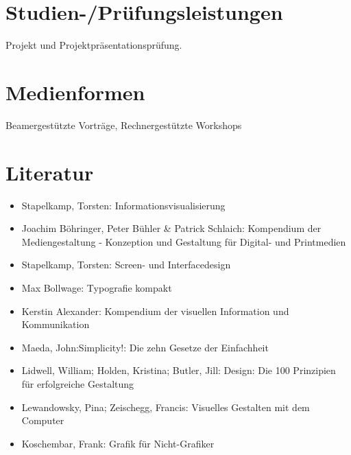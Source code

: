 \hypertarget{studien-pruxfcfungsleistungenpathlabel....srcmodulbeschreibungen-bachelor-bpo5ba_screendesign}{%
\section*{Studien-/Prüfungsleistungen\label{../../src/modulbeschreibungen-bachelor-bpo5/BA_Screendesign}}\label{studien-pruxfcfungsleistungenpathlabel....srcmodulbeschreibungen-bachelor-bpo5ba_screendesign}}

Projekt und Projektpräsentationsprüfung.

\hypertarget{medienformenpathlabel....srcmodulbeschreibungen-bachelor-bpo5ba_screendesign}{%
\section*{Medienformen\label{../../src/modulbeschreibungen-bachelor-bpo5/BA_Screendesign}}\label{medienformenpathlabel....srcmodulbeschreibungen-bachelor-bpo5ba_screendesign}}

Beamergestützte Vorträge, Rechnergestützte Workshops

\hypertarget{literaturpathlabel....srcmodulbeschreibungen-bachelor-bpo5ba_screendesign}{%
\section*{Literatur\label{../../src/modulbeschreibungen-bachelor-bpo5/BA_Screendesign}}\label{literaturpathlabel....srcmodulbeschreibungen-bachelor-bpo5ba_screendesign}}

\begin{itemize}
\tightlist
\item
  Stapelkamp, Torsten: Informationsvisualisierung
\item
  Joachim Böhringer, Peter Bühler \& Patrick Schlaich: Kompendium der
  Mediengestaltung - Konzeption und Gestaltung für Digital- und
  Printmedien
\item
  Stapelkamp, Torsten: Screen- und Interfacedesign
\item
  Max Bollwage: Typografie kompakt
\item
  Kerstin Alexander: Kompendium der visuellen Information und
  Kommunikation
\item
  Maeda, John:Simplicity!: Die zehn Gesetze der Einfachheit
\item
  Lidwell, William; Holden, Kristina; Butler, Jill: Design: Die 100
  Prinzipien für erfolgreiche Gestaltung
\item
  Lewandowsky, Pina; Zeischegg, Francis: Visuelles Gestalten mit dem
  Computer
\item
  Koschembar, Frank: Grafik für Nicht-Grafiker
\end{itemize}

